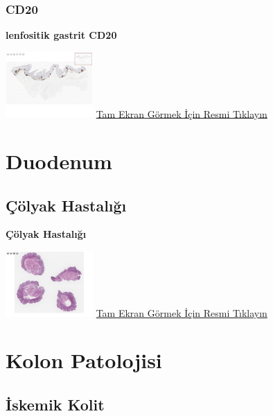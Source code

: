 \documentclass[
  letterpaper,
  DIV=11,
  numbers=noendperiod]{scrreprt}
\begin{document}
\hypertarget{cd20}{%
\subsection{CD20}\label{cd20}}

\textbf{lenfositik gastrit CD20}

\href{https://images.patolojiatlasi.com/lymphocytic-gastritis/CD20.html}{\includegraphics[width=0.25\textwidth,height=\textheight]{./screenshots/lymphocytic-gastritisCD20_screenshot.png}}
\href{https://images.patolojiatlasi.com/lymphocytic-gastritis/CD20.html}{Tam
Ekran Görmek İçin Resmi Tıklayın}

\hypertarget{sec-duodenum}{%
\chapter{Duodenum}\label{sec-duodenum}}

\hypertarget{sec-colyak-hastaligi}{%
\section{Çölyak Hastalığı}\label{sec-colyak-hastaligi}}

\textbf{Çölyak Hastalığı}

\href{https://images.patolojiatlasi.com/celiac-disease/HE.html}{\includegraphics[width=0.25\textwidth,height=\textheight]{./screenshots/celiac-disease_screenshot.png}}
\href{https://images.patolojiatlasi.com/celiac-disease/HE.html}{Tam
Ekran Görmek İçin Resmi Tıklayın}

\hypertarget{sec-kolon-patolojisi}{%
\chapter{Kolon Patolojisi}\label{sec-kolon-patolojisi}}

\hypertarget{sec-iskemik-kolit}{%
\section{İskemik Kolit}\label{sec-iskemik-kolit}}
\end{document}
